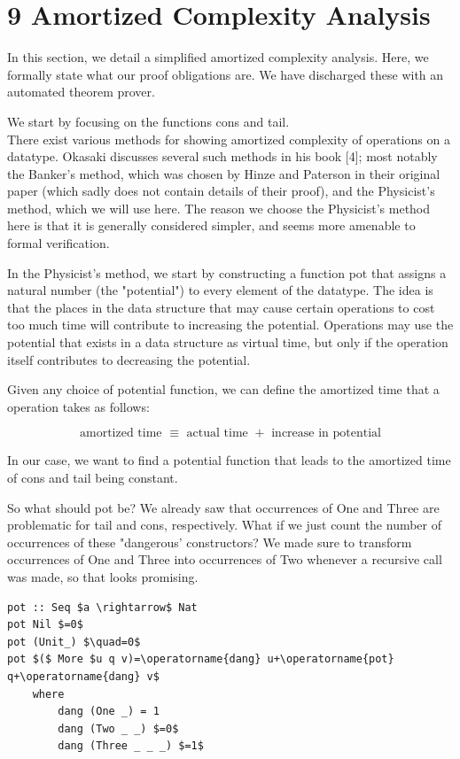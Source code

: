 \documentclass[10pt]{article}
\begin{document}
\section*{9 Amortized Complexity Analysis}
In this section, we detail a simplified amortized complexity analysis. Here, we formally state what our proof obligations are. We have discharged these with an automated theorem prover.

We start by focusing on the functions cons and tail.\\[0pt]
There exist various methods for showing amortized complexity of operations on a datatype. Okasaki discusses several such methods in his book [4]; most notably the Banker's method, which was chosen by Hinze and Paterson in their original paper (which sadly does not contain details of their proof), and the Physicist's method, which we will use here. The reason we choose the Physicist's method here is that it is generally considered simpler, and seems more amenable to formal verification.

In the Physicist's method, we start by constructing a function pot that assigns a natural number (the "potential") to every element of the datatype. The idea is that the places in the data structure that may cause certain operations to cost\\
too much time will contribute to increasing the potential. Operations may use the potential that exists in a data structure as virtual time, but only if the operation itself contributes to decreasing the potential.

Given any choice of potential function, we can define the amortized time that a operation takes as follows:

$$
\text { amortized time } \equiv \text { actual time }+ \text { increase in potential }
$$

In our case, we want to find a potential function that leads to the amortized time of cons and tail being constant.

So what should pot be? We already saw that occurrences of One and Three are problematic for tail and cons, respectively. What if we just count the number of occurrences of these "dangerous' constructors? We made sure to transform occurrences of One and Three into occurrences of Two whenever a recursive call was made, so that looks promising.

\begin{verbatim}
pot :: Seq $a \rightarrow$ Nat
pot Nil $=0$
pot (Unit_) $\quad=0$
pot $($ More $u q v)=\operatorname{dang} u+\operatorname{pot} q+\operatorname{dang} v$
    where
        dang (One _) = 1
        dang (Two _ _) $=0$
        dang (Three _ _ _) $=1$
\end{verbatim}
\end{document}
